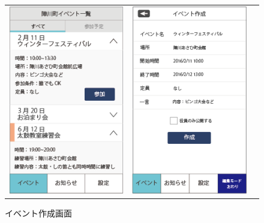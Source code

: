 \begin{figure}[h]
    \begin{tabular}{ccc}
      \begin{minipage}[t]{0.3\hsize}
        \centering
        \includegraphics[keepaspectratio, scale=0.5]{process_figures/eventlist.png}
        \caption{イベントリスト画面}
        \label{eventlist}
      \end{minipage} &
      \begin{minipage}[t]{0.3\hsize}
        \centering
        \includegraphics[keepaspectratio, scale=0.5]{process_figures/new_create_event.png}
        \caption{イベント作成画面}
        \label{new_create_event}

\end{minipage}
\end{tabular}
\end{figure}
